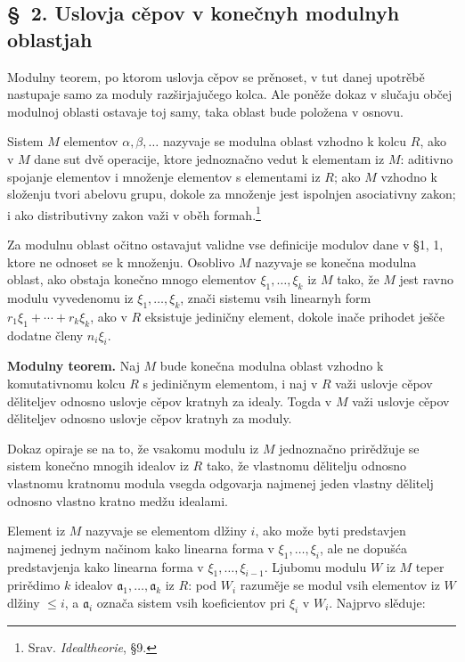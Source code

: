\documentclass[11pt]{article}
\begin{document}
\setcounter{footnote}{11}

\subsection*{\S~2. Uslovja cěpov v konečnyh modulnyh oblastjah}

Modulny teorem, po ktorom uslovja cěpov se prěnoset, v tut danej upotrěbě nastupaje samo za moduly razširjajučego kolca. Ale poněže dokaz v slučaju občej modulnoj oblasti ostavaje toj samy, taka oblast bude položena v osnovu.

Sistem $M$ elementov $\alpha,\beta,\ldots$ nazyvaje se modulna oblast vzhodno k kolcu $R$, ako v $M$ dane sut dvě operacije, ktore jednoznačno vedut k elementam iz $M$: aditivno spojanje elementov i množenje elementov s elementami iz $R$; ako $M$ vzhodno k složenju tvori abelovu grupu, dokole za množenje jest ispolnjen asociativny zakon; i ako distributivny zakon važi v oběh formah.\footnote{Srav. \emph{Idealtheorie}, §9.}

Za modulnu oblast očitno ostavajut validne vse definicije modulov dane v §1, 1, ktore ne odnoset se k množenju. Osoblivo $M$ nazyvaje se konečna modulna oblast, ako obstaja konečno mnogo elementov $\xi_1,\ldots,\xi_k$ iz $M$ tako, že $M$ jest ravno modulu vyvedenomu iz $\xi_1,\ldots,\xi_k$, znači sistemu vsih linearnyh form $r_1\xi_1+\cdots+r_k\xi_k$, ako v $R$ eksistuje jediničny element, dokole inače prihodet ješče dodatne členy $n_i\xi_i$.

\medskip
\noindent\textbf{Modulny teorem.} Naj $M$ bude konečna modulna oblast vzhodno k komutativnomu kolcu $R$ s jediničnym elementom, i naj v $R$ važi uslovje cěpov děliteljev odnosno uslovje cěpov kratnyh za idealy. Togda v $M$ važi uslovje cěpov děliteljev odnosno uslovje cěpov kratnyh za moduly.

Dokaz opiraje se na to, že vsakomu modulu iz $M$ jednoznačno prirědžuje se sistem konečno mnogih idealov iz $R$ tako, že vlastnomu dělitelju odnosno vlastnomu kratnomu modula vsegda odgovarja najmenej jeden vlastny dělitelj odnosno vlastno kratno medžu idealami.

Element iz $M$ nazyvaje se elementom dlžiny $i$, ako može byti predstavjen najmenej jednym načinom kako linearna forma v $\xi_1,\ldots,\xi_i$, ale ne dopušća predstavjenja kako linearna forma v $\xi_1,\ldots,\xi_{i-1}$. Ljubomu modulu $W$ iz $M$ teper prirědimo $k$ idealov $\mathfrak a_1,\ldots,\mathfrak a_k$ iz $R$: pod $W_i$ razuměje se modul vsih elementov iz $W$ dlžiny $\le i$, a $\mathfrak a_i$ označa sistem vsih koeficientov pri $\xi_i$ v $W_i$. Najprvo slěduje:
\end{document}
